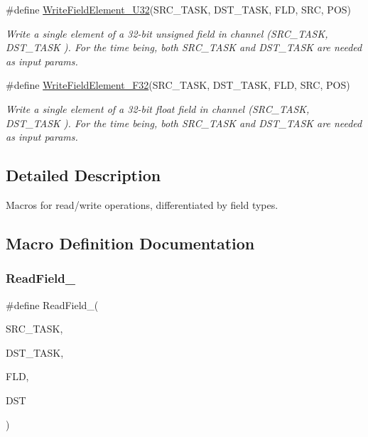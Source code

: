 \begin{DoxyCompactItemize}
\#define \hyperlink{group__interpow__read__write_ga61bc8f63b25404b555c65c108947a0c4}{Write\+Field\+Element\+\_\+\+U32}(S\+R\+C\+\_\+\+T\+A\+SK,  D\+S\+T\+\_\+\+T\+A\+SK,  F\+LD,  S\+RC,  P\+OS)
\begin{DoxyCompactList}\small\item\em Write a single element of a 32-\/bit unsigned field in channel ({\itshape S\+R\+C\+\_\+\+T\+A\+SK}, {\itshape D\+S\+T\+\_\+\+T\+A\+SK} ). For the time being, both S\+R\+C\+\_\+\+T\+A\+SK and D\+S\+T\+\_\+\+T\+A\+SK are needed as input params. \end{DoxyCompactList}\item 
\#define \hyperlink{group__interpow__read__write_gac680c31fb99e389820321fc05f383c33}{Write\+Field\+Element\+\_\+\+F32}(S\+R\+C\+\_\+\+T\+A\+SK,  D\+S\+T\+\_\+\+T\+A\+SK,  F\+LD,  S\+RC,  P\+OS)
\begin{DoxyCompactList}\small\item\em Write a single element of a 32-\/bit float field in channel ({\itshape S\+R\+C\+\_\+\+T\+A\+SK}, {\itshape D\+S\+T\+\_\+\+T\+A\+SK} ). For the time being, both S\+R\+C\+\_\+\+T\+A\+SK and D\+S\+T\+\_\+\+T\+A\+SK are needed as input params. \end{DoxyCompactList}\end{DoxyCompactItemize}


\subsection{Detailed Description}
Macros for read/write operations, differentiated by field types. 

\subsection{Macro Definition Documentation}
\mbox{\label{group__interpow__read__write_ga419c870d721751b80a9e21b571351f4d}} 
\subsubsection{\texorpdfstring{Read\+Field\+\_}{ReadField\_16}}
{\footnotesize\ttfamily \#define Read\+Field\+\_(\begin{DoxyParamCaption}\item[{}]{S\+R\+C\+\_\+\+T\+A\+SK,  }\item[{}]{D\+S\+T\+\_\+\+T\+A\+SK,  }\item[{}]{F\+LD,  }\item[{}]{D\+ST }\end{DoxyParamCaption})}



